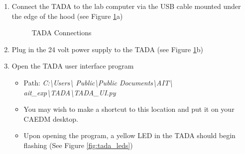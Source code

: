 \documentclass[letterpaper,11pt]{article}
\begin{document}
\begin{enumerate}
    \item Connect the TADA to the lab computer via the USB cable mounted 
        under the edge of the hood (see Figure \ref{fig:tada_connect}a)

		
\begin{figure}[H]
    \centering
    \qquad
    \caption{TADA Connections}
    \label{fig:tada_connect}
\end{figure}
        
    \item Plug in the 24 volt power supply to the TADA (see Figure 
        \ref{fig:tada_connect}b)
    
    

    \item Open the TADA user interface program 
            \begin{itemize}
            \item Path: \textit{C:\textbackslash Users\textbackslash  
                Public\textbackslash Public Documents\textbackslash AIT\textbackslash 
                ait\_exp\textbackslash TADA\textbackslash TADA\_UI.py}
            \item You may wish to make a shortcut to this location and put it on 
                your CAEDM desktop.
            \item Upon opening the program, a yellow LED in the TADA should 
                begin flashing (See Figure \ref{fig:tada_leds}) %
            \end{itemize}


\end{enumerate}
\end{document}
